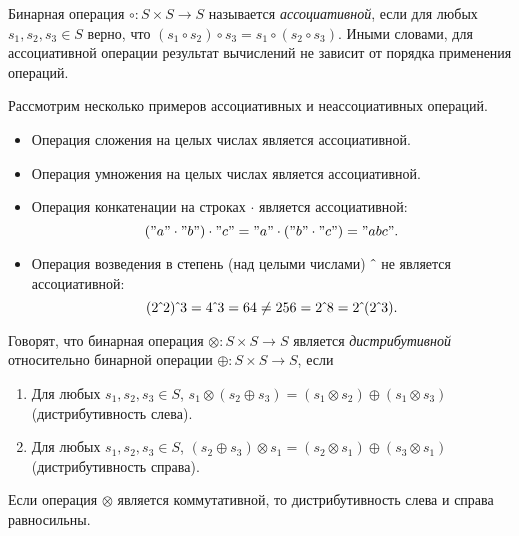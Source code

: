 \begin{definition}
    Бинарная операция $\circ: S \times S \to S$ называется \emph{ассоциативной}, если для любых  $s_1, s_2, s_3 \in S$ верно, что  $(s_1 \circ s_2) \circ s_3 = s_1 \circ (s_2 \circ s_3)$.
    Иными словами, для ассоциативной операции результат вычислений не зависит от порядка применения операций.
\end{definition}

\begin{example} Рассмотрим несколько примеров ассоциативных и неассоциативных операций.
    \begin{itemize}
        \item Операция сложения на целых числах является ассоциативной.
        \item Операция умножения на целых числах является ассоциативной.
        \item Операция конкатенации на строках $\cdot$ является ассоциативной:
              \[("a" \cdot "b") \cdot "c"  = "a" \cdot ("b" \cdot "c") = "abc".\]
        \item Операция возведения в степень (над целыми числами) $\hat{\mkern6mu}$ не является ассоциативной:
              \[(2\hat{\mkern6mu}2)\hat{\mkern6mu}3 = 4 \hat{\mkern6mu} 3 = 64 \neq 256 = 2 \hat{\mkern6mu} 8 = 2\hat{\mkern6mu}(2\hat{\mkern6mu}3).\]
    \end{itemize}
\end{example}

\begin{definition}
    Говорят, что бинарная операция $\otimes: S \times S \to S$ является \emph{дистрибутивной} относительно бинарной операции $\oplus: S \times S \to S$, если
    \begin{enumerate}
        \item Для любых $s_1, s_2, s_3 \in S$, $s_1 \otimes (s_2 \oplus s_3) = (s_1 \otimes s_2) \oplus (s_1 \otimes s_3)$ (дистрибутивность слева).
        \item Для любых $s_1, s_2 ,s_3 \in S$, $(s_2 \oplus s_3) \otimes s_1 = (s_2 \otimes s_1) \oplus (s_3 \otimes s_1)$ (дистрибутивность справа).
    \end{enumerate}
    Если операция $\otimes$ является коммутативной, то дистрибутивность слева и справа равносильны.
\end{definition}

